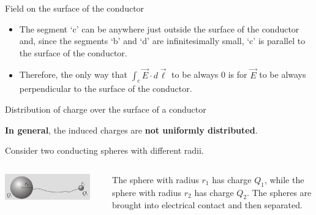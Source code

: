 \begin{frame}{Field on the surface of the conductor}
\begin{itemize}
  \item The segment `c' can be anywhere just outside the surface of the conductor and, since the segments `b' and `d' are
        infinitesimally small, `c' is parallel to the surface of the conductor.
  \item Therefore, the only way that $\int_{c} \vec{E} \cdot d\vec{\ell}$ to be always 0 is for $\vec{E}$ to be
        always perpendicular to the surface of the conductor.
\end{itemize}

\end{frame}



%
%
%

\begin{frame}{Distribution of charge over the surface of a conductor}

{\bf In general}, the induced charges are {\bf not uniformly distributed}.\\
\vspace{0.4cm}

Consider two conducting spheres with different radii.\\
\vspace{0.2cm}

\begin{columns}
  \begin{column}{0.33\textwidth}
  {\small
      \begin{center}
        \includegraphics[width=0.90\textwidth]{./images/schematics/two_electrically_connected_spheres.png}
      \end{center}
  }
  \end{column}
  \begin{column}{0.67\textwidth}
  {\small
    The sphere with radius $r_1$ has charge $Q_1$, while the sphere with radius $r_2$ has charge $Q_2$.
    The spheres are brought into electrical contact and then separated.
  }
  \end{column}
\end{columns}

\vspace{0.3cm}


\end{frame}
